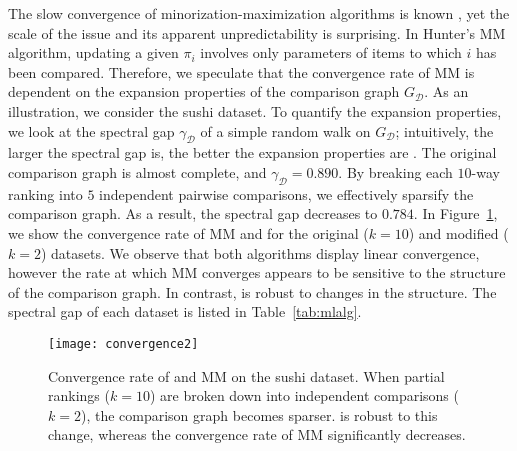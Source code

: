 The slow convergence of minorization-maximization algorithms is known \cite{hunter2004mm}, yet the scale of the issue and its apparent unpredictability is surprising.
In Hunter's MM algorithm, updating a given $\pi_i$ involves only parameters of items to which $i$ has been compared.
Therefore, we speculate that the convergence rate of MM is dependent on the expansion properties of the comparison graph $G_{\mathcal{D}}$.
As an illustration, we consider the sushi dataset.
To quantify the expansion properties, we look at the spectral gap $\gamma_{\mathcal{D}}$ of a simple random walk on $G_{\mathcal{D}}$;
intuitively, the larger the spectral gap is, the better the expansion properties are \citep{levin2008markov}.
The original comparison graph is almost complete, and $\gamma_{\mathcal{D}} = 0.890$.
By breaking each $10$-way ranking into $5$ independent pairwise comparisons, we effectively sparsify the comparison graph.
As a result, the spectral gap decreases to $0.784$.
In Figure~\ref{fig:convergence}, we show the convergence rate of MM and \ILSR{} for the original ($k = 10$) and modified ($k = 2$) datasets.
We observe that both algorithms display linear convergence, however the rate at which MM converges appears to be sensitive to the structure of the comparison graph.
In contrast, \ILSR{} is robust to changes in the structure.
The spectral gap of each dataset is listed in Table~\ref{tab:mlalg}.


\begin{figure}[ht]
\centering
\texttt{[image: convergence2]}
\caption{
Convergence rate of \ILSR{} and MM on the sushi dataset.
When partial rankings ($k = 10$) are broken down into independent comparisons ($k = 2$), the comparison graph becomes sparser.
\ILSR{} is robust to this change, whereas the convergence rate of MM significantly decreases.
}
\label{fig:convergence}
\end{figure}


